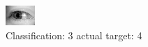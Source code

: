 \begin{figure}[h!]
\begin{center}
\includegraphics[width=0.60\columnwidth]{figures/ID3202_class_3_target_4.png}
\end{center}
\caption{ Classification: 3 actual target: 4}
\label{fig:ID3202_class_3_target_4}
\end{figure}
